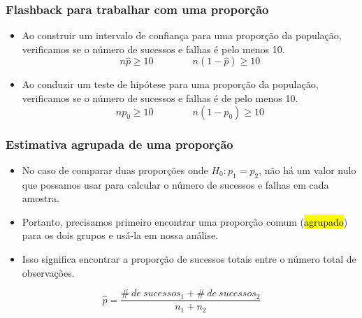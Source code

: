 
\begin{frame}
\frametitle{Flashback para trabalhar com uma proporção}

\begin{itemize}
\justifying
\item Ao construir um intervalo de confiança para uma proporção da população, verificamos se o número de sucessos e falhas  é pelo menos 10.
\[ n\hat{p} \ge 10 \qquad \qquad n(1-\hat{p}) \ge 10 \]

\pause
\justifying
\item Ao conduzir um teste de hipótese para uma proporção da população, verificamos se o número de sucessos e falhas  é de pelo menos 10.
\[ np_0 \ge 10 \qquad \qquad n(1-p_0) \ge 10 \]

\end{itemize}

\end{frame}


\begin{frame}
\frametitle{Estimativa agrupada de uma proporção}

\begin{itemize}
\justifying
\item No caso de comparar duas proporções onde $ H_0: p_1 = p_2 $, não há um valor nulo que possamos usar para calcular o número de sucessos e falhas  em cada amostra.

\pause
\justifying
\item Portanto, precisamos primeiro encontrar uma proporção comum (\hl {agrupado}) para os dois grupos e usá-la em nossa análise.

\pause
\justifying
\item Isso significa encontrar a proporção de sucessos totais entre o número total de observações.

\end{itemize}

$\:$ \\
\justifying
{}
{ \[ \hat{p} = \frac{\#~de~sucessos_1 + \#~de~sucessos_2}{n_1 + n_2} \] }

\end{frame}


